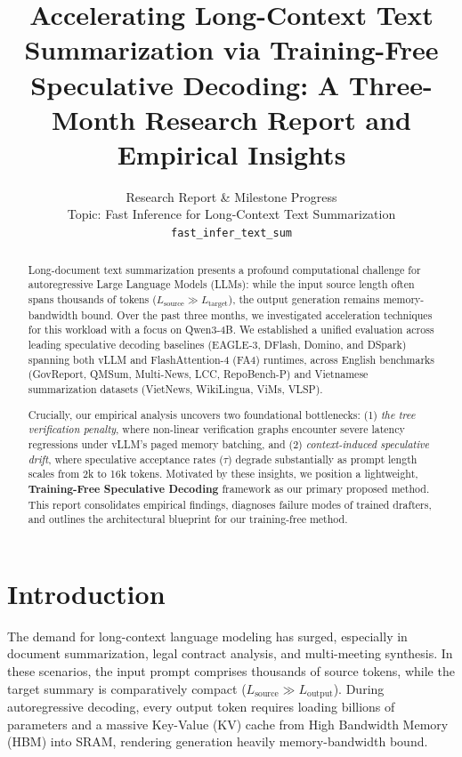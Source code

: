 \documentclass[11pt]{article}
\title{Accelerating Long-Context Text Summarization via Training-Free Speculative Decoding: A Three-Month Research Report and Empirical Insights}
\author{
  Research Report \& Milestone Progress \\
  Topic: Fast Inference for Long-Context Text Summarization \\
  \texttt{fast\_infer\_text\_sum}
}
\date{}
\begin{document}
\maketitle

\begin{abstract}
Long-document text summarization presents a profound computational challenge for autoregressive Large Language Models (LLMs): while the input source length often spans thousands of tokens ($L_{\mathrm{source}} \gg L_{\mathrm{target}}$), the output generation remains memory-bandwidth bound. Over the past three months, we investigated acceleration techniques for this workload with a focus on Qwen3-4B. We established a unified evaluation across leading speculative decoding baselines (EAGLE-3, DFlash, Domino, and DSpark) spanning both vLLM and FlashAttention-4 (FA4) runtimes, across English benchmarks (GovReport, QMSum, Multi-News, LCC, RepoBench-P) and Vietnamese summarization datasets (VietNews, WikiLingua, ViMs, VLSP). 

Crucially, our empirical analysis uncovers two foundational bottlenecks: (1) \textit{the tree verification penalty}, where non-linear verification graphs encounter severe latency regressions under vLLM's paged memory batching, and (2) \textit{context-induced speculative drift}, where speculative acceptance rates ($\tau$) degrade substantially as prompt length scales from 2k to 16k tokens. Motivated by these insights, we position a lightweight, \textbf{Training-Free Speculative Decoding} framework as our primary proposed method. This report consolidates empirical findings, diagnoses failure modes of trained drafters, and outlines the architectural blueprint for our training-free method.
\end{abstract}

\section{Introduction}

The demand for long-context language modeling has surged, especially in document summarization, legal contract analysis, and multi-meeting synthesis. In these scenarios, the input prompt comprises thousands of source tokens, while the target summary is comparatively compact ($L_{\mathrm{source}} \gg L_{\mathrm{output}}$). During autoregressive decoding, every output token requires loading billions of parameters and a massive Key-Value (KV) cache from High Bandwidth Memory (HBM) into SRAM, rendering generation heavily memory-bandwidth bound.
\end{document}
